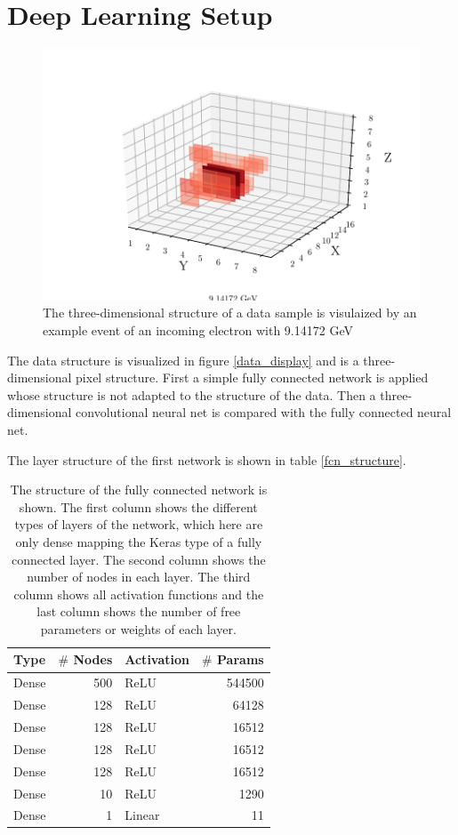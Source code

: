 \documentclass[12pt, a4paper]{thesis}
\begin{document}
\section{Deep Learning Setup}
\label{sec:orgb3e1899}

\begin{figure}[htbp]
\centering
\includegraphics[width=.9\linewidth]{../images/data_display.pdf}
\caption{\label{fig:org7b634ac}
The three-dimensional structure of a data sample is visulaized by an example event of an incoming electron with 9.14172 GeV}
\end{figure}

The data structure is visualized in figure \ref{data_display} and is a
three-dimensional pixel structure. First a simple fully connected
network is applied whose structure is not adapted to the structure of
the data. Then a three-dimensional convolutional neural net is
compared with the fully connected neural net.

The layer structure of the first network is shown in table \ref{fcn_structure}.

\begin{table}[htbp]
\caption{\label{tab:org9c50f0f}
The structure of the fully connected network is shown. The first column shows the different types of layers of the network, which here are only dense mapping the Keras type of a fully connected layer. The second column shows the number of nodes in each layer. The third column shows all activation functions and the last column shows the number of free parameters or weights of each layer.}
\centering
\begin{tabular}{lrlr}
Type & \(\#\) Nodes & Activation & \(\#\) Params\\
\hline
Dense & 500 & ReLU & 544500\\
Dense & 128 & ReLU & 64128\\
Dense & 128 & ReLU & 16512\\
Dense & 128 & ReLU & 16512\\
Dense & 128 & ReLU & 16512\\
Dense & 10 & ReLU & 1290\\
Dense & 1 & Linear & 11\\
\end{tabular}
\end{table}
\end{document}
